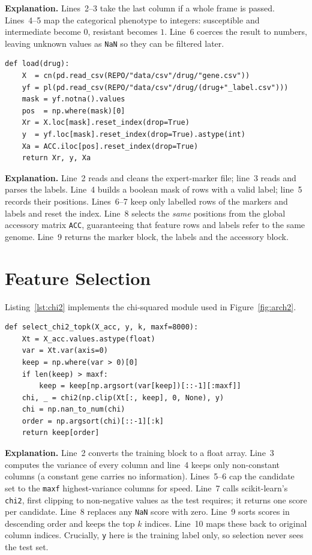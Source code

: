 \documentclass[../main.tex]{subfiles}
\begin{document}
\noindent\textbf{Explanation.} Lines~2--3 take the last column if a whole frame is passed. Lines~4--5 map the categorical phenotype to integers: susceptible and intermediate become $0$, resistant becomes $1$. Line~6 coerces the result to numbers, leaving unknown values as \texttt{NaN} so they can be filtered later.

\begin{lstlisting}[caption={Loading one antibiotic with aligned accessory rows.},label=lst:load]
def load(drug):
    X  = cn(pd.read_csv(REPO/"data/csv"/drug/"gene.csv"))
    yf = pl(pd.read_csv(REPO/"data/csv"/drug/(drug+"_label.csv")))
    mask = yf.notna().values
    pos  = np.where(mask)[0]
    Xr = X.loc[mask].reset_index(drop=True)
    y  = yf.loc[mask].reset_index(drop=True).astype(int)
    Xa = ACC.iloc[pos].reset_index(drop=True)
    return Xr, y, Xa
\end{lstlisting}

\noindent\textbf{Explanation.} Line~2 reads and cleans the expert-marker file; line~3 reads and parses the labels. Line~4 builds a boolean mask of rows with a valid label; line~5 records their positions. Lines~6--7 keep only labelled rows of the markers and labels and reset the index. Line~8 selects the \emph{same} positions from the global accessory matrix \texttt{ACC}, guaranteeing that feature rows and labels refer to the same genome. Line~9 returns the marker block, the labels and the accessory block.

\section{Feature Selection}

Listing~\ref{lst:chi2} implements the chi-squared module used in Figure~\ref{fig:arch2}.

\begin{lstlisting}[caption={Chi-squared top-$k$ selection (train only).},label=lst:chi2]
def select_chi2_topk(X_acc, y, k, maxf=8000):
    Xt = X_acc.values.astype(float)
    var = Xt.var(axis=0)
    keep = np.where(var > 0)[0]
    if len(keep) > maxf:
        keep = keep[np.argsort(var[keep])[::-1][:maxf]]
    chi, _ = chi2(np.clip(Xt[:, keep], 0, None), y)
    chi = np.nan_to_num(chi)
    order = np.argsort(chi)[::-1][:k]
    return keep[order]
\end{lstlisting}

\noindent\textbf{Explanation.} Line~2 converts the training block to a float array. Line~3 computes the variance of every column and line~4 keeps only non-constant columns (a constant gene carries no information). Lines~5--6 cap the candidate set to the \texttt{maxf} highest-variance columns for speed. Line~7 calls scikit-learn's \texttt{chi2}, first clipping to non-negative values as the test requires; it returns one score per candidate. Line~8 replaces any \texttt{NaN} score with zero. Line~9 sorts scores in descending order and keeps the top $k$ indices. Line~10 maps these back to original column indices. Crucially, \texttt{y} here is the training label only, so selection never sees the test set.
\end{document}
